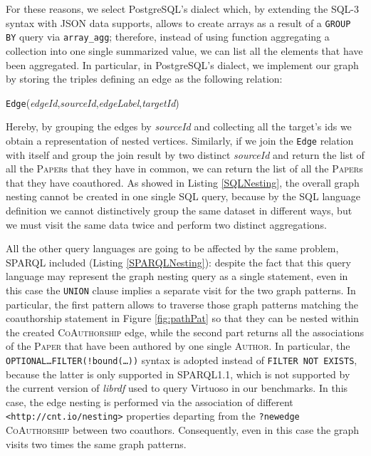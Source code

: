 For these reasons, we select PostgreSQL's dialect which, by extending the SQL-3 syntax with JSON data supports, allows to create arrays as a result of a \texttt{GROUP BY} query via \texttt{array\_agg}; therefore, instead of using function aggregating a collection into one single summarized value, we can list all the elements that have been aggregated. In particular, in PostgreSQL's dialect, we  implement our graph by  storing the triples defining an edge as the following relation:
\begin{center}
 \texttt{Edge}(\textit{edgeId},\;\textit{sourceId},\;\textit{edgeLabel},\;\textit{targetId})
\end{center}
Hereby, by grouping the edges by \textit{sourceId} and collecting all the target's ids we obtain a representation of nested vertices. Similarly, if we join the \texttt{Edge} relation with itself and group the join result by two distinct \textit{sourceId} and return the list of all the \textsc{Paper}s that they have in common, we can return the list of all the \textsc{Paper}s that they have coauthored. As showed in Listing \ref{SQLNesting}, the overall graph nesting cannot be created in one single SQL query, because by  the SQL language definition we cannot distinctively group the same dataset in different ways, but we must visit the same data twice and perform two distinct aggregations. 


All the other query languages are going to be affected by the same problem, SPARQL included (Listing \ref{SPARQLNesting}): despite the fact that this query language may represent the graph nesting query as a single statement, even in this case the \texttt{UNION} clause implies a separate visit for the two graph patterns. In particular, the first pattern allows to traverse those graph patterns matching the coauthorship statement in Figure \ref{fig:pathPat} so that they can be nested within the created \textsc{CoAuthorship} edge, while the second part returns all the associations of the \textsc{Paper} that have been authored by one single \textsc{Author}. In particular, the \texttt{OPTIONAL\dots FILTER(!bound(\dots))} syntax is adopted instead of \texttt{FILTER NOT EXISTS}, because the latter is only supported in SPARQL1.1, which is not supported by the current version of \textit{librdf} used to query Virtuoso in our benchmarks. In this case, the edge nesting is performed via the association of different \texttt{<http://cnt.io/nesting>} properties departing from the \texttt{?newedge}  \textsc{CoAuthorship} between two coauthors. Consequently, even in this case the graph visits two times the same graph patterns.


